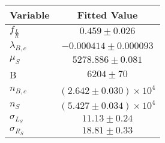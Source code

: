 \begin{tabular}[t]{lc}
\hline
Variable &Fitted Value\\
\hline\hline
$f_{\frac{L}{R}}$&$0.459\pm0.026$\\
\hline
$\lambda_{B,c}$&$-0.000414\pm0.000093$\\
\hline
$\mu_S$&$5278.886\pm0.081$\\
\hline
B&$6204\pm70$\\
\hline
$n_{B,c}$&$(2.642\pm0.030)\times 10^4$\\
\hline
$n_S$&$(5.427\pm0.034)\times 10^4$\\
\hline
$\sigma_{L_S}$&$11.13\pm0.24$\\
\hline
$\sigma_{R_S}$&$18.81\pm0.33$\\
\hline
\end{tabular}